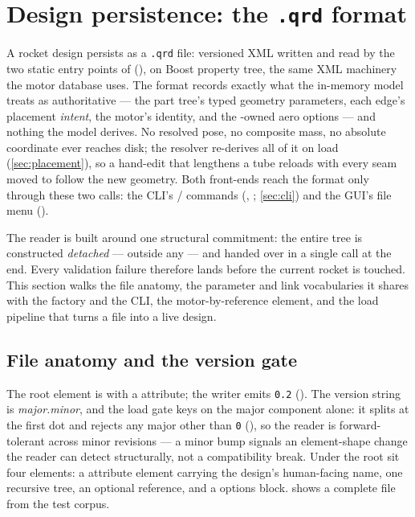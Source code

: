\section[Design persistence: the .qrd format]{Design persistence: the \texttt{.qrd} format}\label{sec:serialization}

A rocket design persists as a \texttt{.qrd} file: versioned XML written and read by the two
static entry points of  (), on
Boost property tree, the same XML machinery the motor database uses. The format records
exactly what the in-memory model treats as authoritative --- the part tree's typed geometry
parameters, each edge's placement \emph{intent}, the motor's identity, and the
-owned aero options --- and nothing the model derives. No resolved pose,
no composite mass, no absolute coordinate ever reaches disk; the resolver re-derives all of
it on load (\cref{sec:placement}), so a hand-edit that lengthens a tube reloads with every
seam moved to follow the new geometry. Both front-ends reach the format only through these
two calls: the CLI's / commands
(, ; \cref{sec:cli}) and the GUI's file
menu ().

The reader is built around one structural commitment: the entire tree is constructed
\emph{detached} --- outside any  --- and handed over in a single
 call at the end. Every validation failure therefore lands before the
current rocket is touched. This section walks the file anatomy, the parameter and link
vocabularies it shares with the factory and the CLI, the motor-by-reference element, and
the load pipeline that turns a file into a live design.

\subsection{File anatomy and the version gate}\label{sec:serialization-anatomy}

The root element is  with a  attribute; the writer
emits \texttt{0.2} (). The version string is
\emph{major.minor}, and the load gate keys on the major component alone: it splits at the
first dot and rejects any major other than \texttt{0}
(), so the reader is forward-tolerant across
minor revisions --- a minor bump signals an element-shape change the reader can detect
structurally, not a compatibility break. Under the root sit four elements: a
 attribute element carrying the design's human-facing name, one
recursive  tree, an optional  reference, and a 
options block.  shows a complete file from the test corpus.

